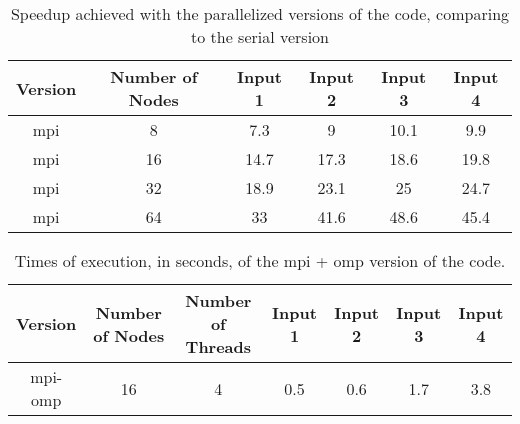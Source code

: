 \documentclass{article}
\begin{document}
\begin{table}[h!]
	\centering
	\begin{tabular}{||c c c c c c||} 
	 \hline
	 Version & Number of Nodes & Input 1 & Input 2 & Input 3 & Input 4\\ [0.5ex] 
	 \hline\hline
	 mpi & 8 & 7.3 & 9 & 10.1 & 9.9 \\ 
	 mpi & 16 & 14.7 & 17.3 & 18.6 & 19.8  \\
	 mpi & 32 & 18.9 & 23.1 & 25 & 24.7 \\
	 mpi & 64 & 33 & 41.6 & 48.6 & 45.4 \\ [1ex] 
	 \hline
	\end{tabular}
	\caption{Speedup achieved with the parallelized versions of the code, comparing to the serial version}
	\label{speedup}
\end{table}

\begin{table}[h!]
	\centering
	\begin{tabular}{||c c c c c c c||} 
	 \hline
	 Version & Number of Nodes & Number of Threads & Input 1 & Input 2 & Input 3 & Input 4\\ [0.5ex] 
	 \hline\hline
	 mpi-omp & 16 & 4 & 0.5 & 0.6 & 1.7 & 3.8 \\  [1ex] 
	 \hline
	\end{tabular}
	\caption{Times of execution, in seconds, of the mpi + omp version of the code.}
	\label{times-mpi-omp}
\end{table}


\newpage



% 

\end{document}
